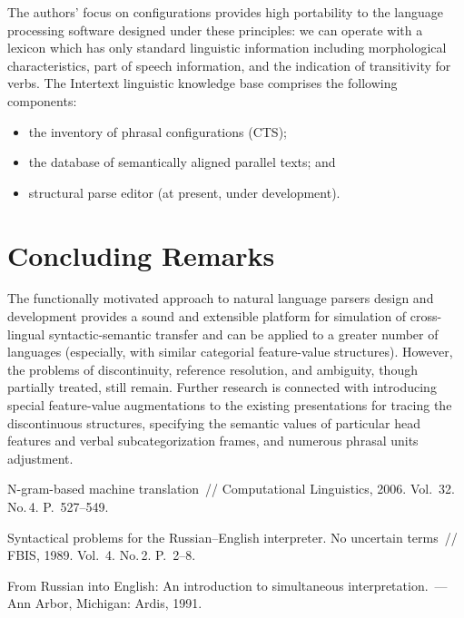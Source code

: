 \begin{multicols}{2}
The authors' focus on configurations provides high portability to the language 
processing software designed under these principles: we can operate with a lexicon 
which has only standard linguistic information including morphological 
characteristics, part of speech information, and the indication of transitivity for 
verbs. The Intertext linguistic knowledge base comprises the following 
components: 
     \begin{itemize}
\item the inventory of phrasal configurations (CTS);
\item the database of semantically aligned parallel texts;  and
\item structural parse editor (at present, under development). 
\end{itemize}

\section{Concluding Remarks}

\noindent
     The functionally motivated approach to natural language parsers design and 
development provides a sound and extensible platform for simulation of 
     cross-lingual syntactic-semantic transfer and can be applied to a greater 
number of languages (especially, with similar categorial feature-value structures). 
However, the problems of discontinuity, reference resolution, and ambiguity, 
though partially treated, still remain. Further research is connected with 
introducing special feature-value augmentations to the existing presentations for 
tracing the discontinuous structures, specifying the semantic values of particular 
head features and verbal subcategorization frames, and numerous phrasal units 
adjustment. 

{\small\frenchspacing
{%
\begin{thebibliography}{99}
 
       
     N-gram-based machine translation~// Computational Linguistics, 2006. 
Vol.~32. No.\,4. P.~527--549.

     Syntactical problems for the Russian--English interpreter. No uncertain 
terms~// FBIS, 1989. Vol.~4. No.\,2. P.~2--8.
     
     From Russian into English: An introduction to simultaneous 
interpretation.~--- Ann Arbor, Michigan: Ardis, 1991.
     

\end{thebibliography}}}
\end{multicols}
